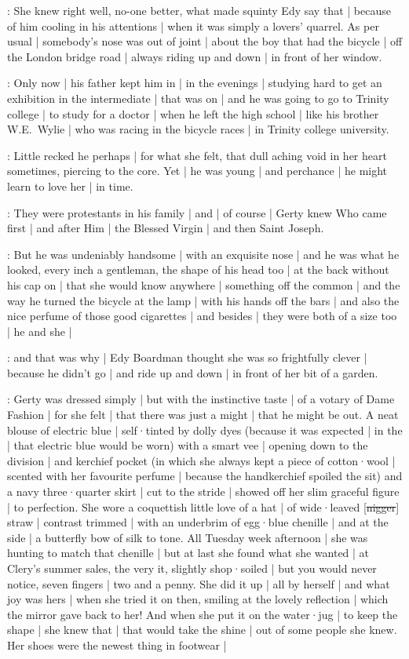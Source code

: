 \gertyJudgy:
She knew right well,
no-one better,
what made squinty Edy say that |
because of him cooling in his attentions |
when it was simply a lovers' quarrel.
As per usual |
somebody's nose was out of joint |%
about the boy that had the bicycle |
off the London bridge road |
always riding up and down |
in front of her window.

\gertyReal:
Only now |
his father kept him in |
in the evenings |
studying hard to get an exhibition in the intermediate |
that was on |
and he was going to go to Trinity college |
to study for a doctor |
when he left the high school |
like his brother W.E.~Wylie |
who was racing in the bicycle races |
in Trinity college university.

\gertyRomantic:
Little recked he perhaps |
for what she felt,
that dull aching void in her heart sometimes,
piercing to the core.
Yet |
he was young |
and perchance |
he might learn to love her |
in time.

\gertyReal:
They were protestants in his family |
and |
of course |
Gerty knew Who came first |
and after Him |
the Blessed Virgin |
and then Saint Joseph.%

\gertyRomantic:
But he was undeniably handsome |
with an exquisite nose |
and he was what he looked,
every inch a gentleman,
the shape of his head too |
at the back without his cap on |
that she would know anywhere |
something off the common |
and the way he turned the bicycle at the lamp |
with his hands off the bars |
and also the nice perfume of those good cigarettes |
and besides |
they were both of a size too |
he and she |

\gertyJudgy:
and that was why |
Edy Boardman thought she was so frightfully clever |
because he didn't go |
and ride up and down |
in front of her bit of a garden.

\gertyReal:
Gerty was dressed simply |
but with the instinctive taste |
of a votary of Dame Fashion |
for she felt |
that there was just a might |
that he might be out.
A neat blouse of electric blue |
self·tinted by dolly dyes
(because it was expected |
in the  |
that electric blue would be worn)
with a smart vee |
opening down to the division |
and kerchief pocket
(in which
she always kept a piece of cotton·wool |
scented with her favourite perfume |
because the handkerchief spoiled the sit)
and a navy three·quarter skirt |
cut to the stride |
showed off her slim graceful figure |
to perfection.
She wore a coquettish little love of a hat |
of wide·leaved [\sout{nigger}] straw |
contrast trimmed |
with an underbrim of egg·blue chenille |
and at the side |
a butterfly bow of silk to tone.
All Tuesday week afternoon |
she was hunting to match that chenille |
but at last
she found what she wanted |
at Clery's summer sales,
the very it,
slightly shop·soiled |
but you would never notice,%
seven fingers |
two and a penny.
She did it up |
all by herself |
and what joy was hers |
when she tried it on then,
smiling at the lovely reflection |
which the mirror gave back to her!
And when she put it on the water·jug |
to keep the shape |
she knew that |
that would take the shine |
out of some people she knew.
Her shoes were the newest thing in footwear |

